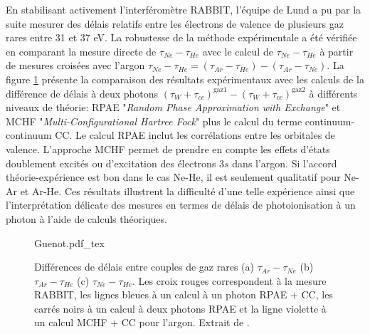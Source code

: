 En stabilisant activement l'interféromètre RABBIT, l'équipe de Lund a pu par la suite mesurer des délais relatifs entre les électrons de valence de plusieurs gaz rares entre 31 et 37 eV. La robustesse de la méthode expérimentale a été vérifiée en comparant la mesure directe de  $\tau_{Ne} - \tau_{He}$ avec le calcul de $\tau_{Ne} - \tau_{He}$ à partir de mesures croisées avec l'argon $\tau_{Ne} - \tau_{He} = (\tau_{Ar} - \tau_{He}) - (\tau_{Ar} - \tau_{Ne})$. La figure \ref{fig:Guenot} présente la comparaison des résultats expérimentaux avec les calculs de la différence de délais à deux photons $(\tau_W + \tau_{cc})^{\mathrm{gaz} 1} - (\tau_W + \tau_{cc})^{\mathrm{gaz} 2}$ à différents niveaux de théorie: RPAE "\textit{Random Phase Approximation with Exchange}"  et MCHF "\textit{Multi-Configurational Hartree Fock}"  plus le calcul du terme continuum-continuum CC. Le calcul RPAE inclut les corrélations entre les orbitales de valence. L'approche MCHF permet de prendre en compte les effets d'états doublement excités ou d'excitation des électrons $3s$ dans l'argon. Si l'accord théorie-expérience est bon dans le cas Ne-He, il est seulement qualitatif pour Ne-Ar et Ar-He. Ces résultats illustrent la difficulté d'une telle expérience ainsi que l'interprétation délicate des mesures en termes de délais de photoionisation à un photon à l'aide de calculs théoriques.
\begin{figure}
\centering
\def\svgwidth{\textwidth}
{Guenot.pdf_tex}
\caption{Différences de délais entre couples de gaz rares (a) $\tau_{Ar} - \tau_{Ne}$ (b) $\tau_{Ar} - \tau_{He}$ (c) $\tau_{Ne} - \tau_{He}$. Les croix rouges correspondent à la mesure RABBIT, les lignes bleues à un calcul à un photon RPAE + CC, les carrés noirs à un calcul à deux photons RPAE et la ligne violette à un calcul MCHF + CC pour l'argon. Extrait de .}
\label{fig:Guenot}
\end{figure}

